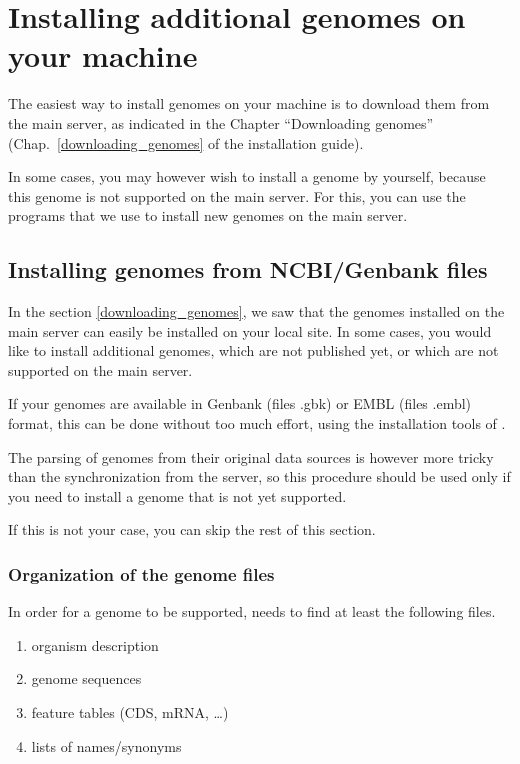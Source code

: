 

\chapter{Installing additional genomes on your machine}

The easiest way to install genomes on your machine is to download them
from the main \RSAT server, as indicated in the Chapter ``Downloading
genomes'' (Chap.~\ref{downloading_genomes} of the installation guide).

In some cases, you may however wish to install a genome by yourself,
because this genome is not supported on the main \RSAT server. For
this, you can use the programs that we use to install new genomes on
the main \RSAT server.

\section{Installing genomes from  NCBI/Genbank files}

In the section \ref{downloading_genomes}, we saw that the genomes
installed on the main \RSAT server can easily be installed on your
local site. In some cases, you would like to install additional
genomes, which are not published yet, or which are not supported on
the main \RSAT server.

If your genomes are available in Genbank (files .gbk) or EMBL (files
.embl) format, this can be done without too much effort, using the
installation tools of \RSAT. 

The parsing of genomes from their original data sources is however
more tricky than the synchronization from the \RSAT server, so this
procedure should be used only if you need to install a genome that is
not yet supported. 

If this is not your case, you can skip the rest of this section.

\subsection{Organization of the genome files}

In order for a genome to be supported, \RSAT needs to find at least
the following files.

\begin{enumerate}
\item organism description
\item genome sequences
\item feature tables (CDS, mRNA, \ldots)
\item lists of names/synonyms
\end{enumerate}

